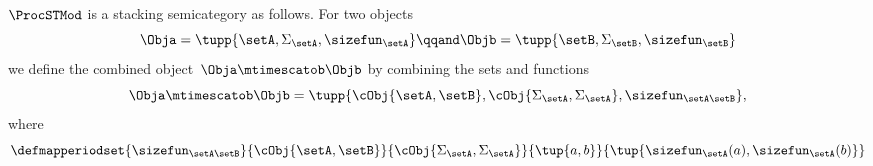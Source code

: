 \begin{lemma}\label{lem:ProcSTMod-stacking}
    $\ProcSTMod$ is a stacking semicategory as follows.
    For two objects
    \begin{equation}
        \Obja = \tupp{\setA, \Sigma_{\setA}, \sizefun_{\setA}}
        \qqand
        \Objb = \tupp{\setB, \Sigma_{\setB}, \sizefun_{\setB}}
    \end{equation}
    we define the combined object~$\Obja \mtimescatob \Objb$ by combining the sets and functions
    \begin{equation}
        \Obja \mtimescatob \Objb = \tupp{
            \cObj {\setA,\setB},
            \cObj {\Sigma_{\setA}, \Sigma_{\setA}},
            \sizefun_{\setA\setB}
        },
    \end{equation}
    where
    \begin{equation}
        \defmapperiodset{
            \sizefun_{\setA\setB}
        }{
            \cObj {\setA, \setB}
        }{
            \cObj {\Sigma_{\setA}, \Sigma_{\setA}}
        }{
            \tup{a,b}
        }{
            \tup{
                \sizefun_{\setA}(a),
                \sizefun_{\setA}(b)
            }
        }
    \end{equation}


\end{lemma}
